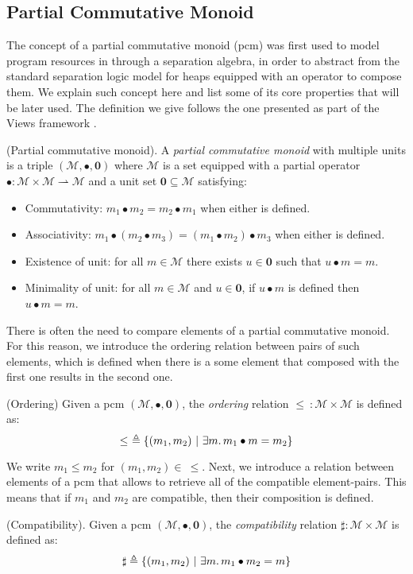\subsection{Partial Commutative Monoid}

\label{sec:pcm}

The concept of a partial commutative monoid (pcm) was first used to model program resources in \cite{sepalgebra} through a separation algebra, in order to abstract from the standard separation logic model for heaps equipped with an operator to compose them. We explain such concept here and list some of its core properties that will be later used. The definition we give follows the one presented as part of the Views framework \cite{views}.

\begin{defn}
	(Partial commutative monoid).
	A \emph{partial commutative monoid} with multiple units is a triple $(\mathcal{M}, \bullet, \mathbf{0})$ where $\mathcal{M}$ is a set equipped with a partial operator $\bullet : \mathcal{M} \times \mathcal{M} \rightharpoonup \mathcal{M}$ and a unit set $\mathbf{0} \subseteq \mathcal{M}$ satisfying:
	\begin{itemize}
		\item Commutativity: $m_1 \bullet m_2 = m_2 \bullet m_1$ when either is defined.
		\item Associativity: $m_1 \bullet (m_2 \bullet m_3) = (m_1 \bullet m_2) \bullet m_3$ when either is defined.
		\item Existence of unit: for all $m \in \mathcal{M}$ there exists $u \in \mathbf{0}$ such that $u \bullet m = m$.
		\item Minimality of unit: for all $m \in \mathcal{M}$ and $u \in \mathbf{0}$, if $u \bullet m$ is defined then $u \bullet m = m$.
	\end{itemize}
\end{defn}

There is often the need to compare elements of a partial commutative monoid. For this reason, we introduce the ordering relation between pairs of such elements, which is defined when there is a some element that composed with the first one results in the second one.
\begin{defn}
	(Ordering)
	Given a pcm $(\mathcal{M}, \bullet, \mathbf{0})$, the \emph{ordering} relation $\leq\ : \mathcal{M} \times \mathcal{M}$ is defined as:
\[
	\leq\ \triangleq \{ (m_1, m_2)\ |\ \exists m \ldotp m_1 \bullet m = m_2 \}
\]
\end{defn}
We write $m_1 \leq m_2$ for $(m_1, m_2) \in\ \leq$. Next, we introduce a relation between elements of a pcm that allows to retrieve all of the compatible element-pairs. This means that if $m_1$ and $m_2$ are compatible, then their composition is defined.

\begin{defn}
	(Compatibility).
	Given a pcm $(\mathcal{M}, \bullet, \mathbf{0})$, the \emph{compatibility} relation $\sharp : \mathcal{M} \times \mathcal{M}$ is defined as:
\[
	\sharp \triangleq \{ (m_1, m_2)\ |\ \exists m \ldotp m_1 \bullet m_2 = m \}
\]
\end{defn}